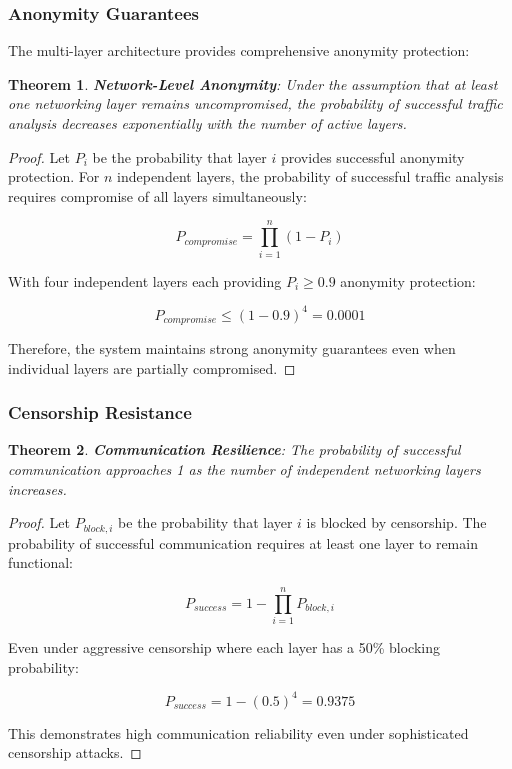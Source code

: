 \documentclass[11pt,a4paper]{article}
\newtheorem{theorem}{Theorem}[section]
\theoremstyle{definition}
\theoremstyle{remark}
\begin{document}
\subsubsection{Anonymity Guarantees}

The multi-layer architecture provides comprehensive anonymity protection:

\begin{theorem}
\textbf{Network-Level Anonymity}: Under the assumption that at least one networking layer remains uncompromised, the probability of successful traffic analysis decreases exponentially with the number of active layers.
\end{theorem}

\begin{proof}
Let $P_i$ be the probability that layer $i$ provides successful anonymity protection. For $n$ independent layers, the probability of successful traffic analysis requires compromise of all layers simultaneously:

$$P_{compromise} = \prod_{i=1}^{n} (1 - P_i)$$

With four independent layers each providing $P_i \geq 0.9$ anonymity protection:

$$P_{compromise} \leq (1 - 0.9)^4 = 0.0001$$

Therefore, the system maintains strong anonymity guarantees even when individual layers are partially compromised.
\end{proof}

\subsubsection{Censorship Resistance}

\begin{theorem}
\textbf{Communication Resilience}: The probability of successful communication approaches 1 as the number of independent networking layers increases.
\end{theorem}

\begin{proof}
Let $P_{block,i}$ be the probability that layer $i$ is blocked by censorship. The probability of successful communication requires at least one layer to remain functional:

$$P_{success} = 1 - \prod_{i=1}^{n} P_{block,i}$$

Even under aggressive censorship where each layer has a 50\% blocking probability:

$$P_{success} = 1 - (0.5)^4 = 0.9375$$

This demonstrates high communication reliability even under sophisticated censorship attacks.
\end{proof}
\end{document}
